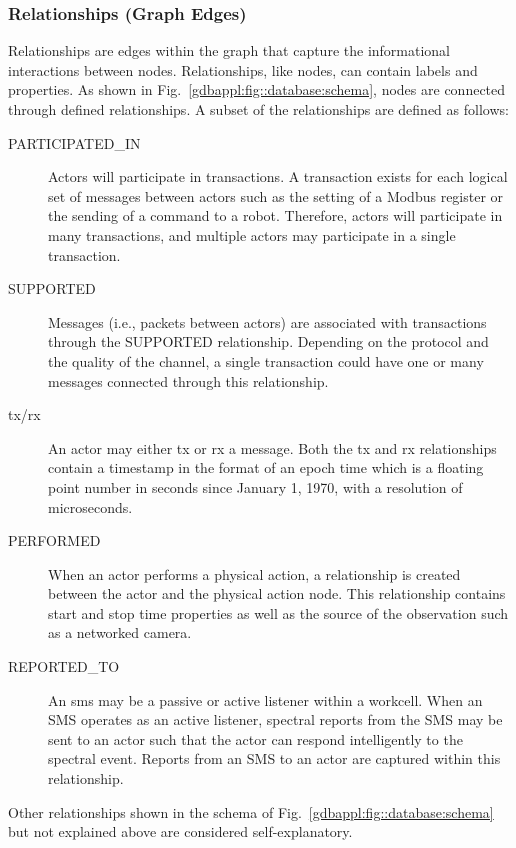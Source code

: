\subsubsection{Relationships (Graph Edges)}
Relationships are edges within the graph that capture the informational interactions between nodes.  Relationships, like nodes, can contain labels and properties.  As shown in Fig.~\ref{gdbappl:fig::database:schema}, nodes are connected through defined relationships.  A subset of the relationships are defined as follows:
\begin{description}
    \item[PARTICIPATED\_IN] Actors will participate in transactions.  A transaction exists for each logical set of messages between actors such as the setting of a Modbus register or the sending of a command to a robot.  Therefore, actors will participate in many transactions, and multiple actors may participate in a single transaction.
    \item[SUPPORTED] Messages (i.e., packets between actors) are associated with transactions through the SUPPORTED relationship. Depending on the protocol and the quality of the channel, a single transaction could have one or many messages connected through this relationship.
    \item[\Gls{tx}/\Gls{rx}] An actor may either \gls{tx} or \gls{rx} a message. Both the \gls{tx} and \gls{rx} relationships contain a timestamp in the format of an epoch time which is a floating point number in seconds since January 1, 1970, with a resolution of microseconds.
    \item[PERFORMED] When an actor performs a physical action, a relationship is created between the actor and the physical action node. This relationship contains start and stop time properties as well as the source of the observation such as a networked camera.
    \item[REPORTED\_TO] An \gls{sms} may be a passive or active listener within a workcell.  When an SMS operates as an active listener, spectral reports from the SMS may be sent to an actor such that the actor can respond intelligently to the spectral event.  Reports from an SMS to an actor are captured within this relationship.
\end{description}
Other relationships shown in the schema of Fig.~\ref{gdbappl:fig::database:schema} but not explained above are considered self-explanatory.

